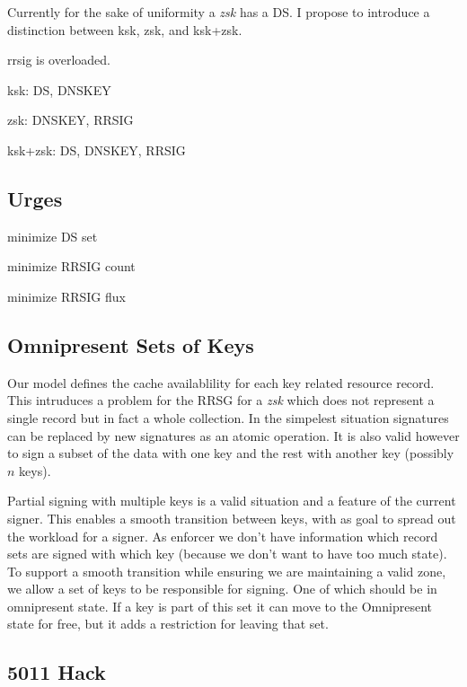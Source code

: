 \documentclass[twoside,english, a4paper]{article}
\begin{document}
Currently for the sake of uniformity a \emph{zsk} has a DS. I propose
to introduce a distinction between ksk, zsk, and ksk+zsk. 

rrsig is overloaded.

\begin{description}
\item ksk: DS, DNSKEY
\item zsk: DNSKEY, RRSIG
\item ksk+zsk: DS, DNSKEY, RRSIG
\end{description}



\subsection{Urges}

minimize DS set

minimize RRSIG count

minimize RRSIG flux


\subsection{Omnipresent Sets of Keys}
\label{redifined-propagated}

Our model defines the cache availablility for each key related resource
record. This intruduces a problem for the RRSG for a \emph{zsk} which
does not represent a single record but in fact a whole collection. 
In the simpelest situation signatures can be replaced by new signatures 
as an atomic operation. It is also valid however to sign a subset of
the data with one key and the rest with another key (possibly $n$ keys).

Partial signing with multiple keys is a valid situation and a 
feature of the current signer. This enables a smooth transition 
between keys, with as goal to spread out the workload for a signer. 
As enforcer we don't have information which record sets are signed 
with which key (because we don't want to have too much state). To 
support a smooth transition while ensuring we are maintaining a 
valid zone, we allow a set of keys to be 
responsible for signing. One of which should be in omnipresent state.
If a key is part of this set it can move to the Omnipresent state for 
free, but it adds a restriction for leaving that set.

\subsection{5011 Hack}
\end{document}
